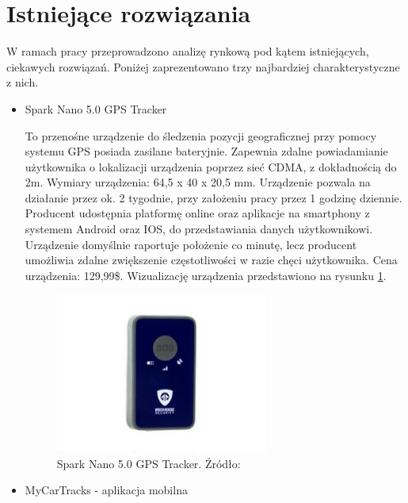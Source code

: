 \section{Istniejące rozwiązania}

W ramach pracy przeprowadzono analizę rynkową pod kątem istniejących, ciekawych rozwiązań. Poniżej zaprezentowano trzy najbardziej charakterystyczne z nich.

\begin{itemize}
\item Spark Nano 5.0 GPS Tracker

To przenośne urządzenie do śledzenia pozycji geograficznej przy pomocy systemu GPS posiada zasilane bateryjnie. Zapewnia zdalne powiadamianie użytkownika o lokalizacji urządzenia poprzez sieć CDMA, z dokładnością do 2m. Wymiary urządzenia: 64,5 x 40 x 20,5 mm. Urządzenie pozwala na działanie przez ok. 2 tygodnie, przy założeniu pracy przez 1 godzinę dziennie. Producent udostępnia platformę online oraz aplikacje na smartphony z systemem Android oraz IOS, do przedstawiania danych użytkownikowi.   Urządzenie domyślnie raportuje położenie co minutę, lecz producent umożliwia zdalne zwiększenie częstotliwości w razie chęci użytkownika. Cena urządzenia: 129,99\$. Wizualizację urządzenia przedstawiono na rysunku \ref{fig:image_spark_nano_tracker}.
\begin{figure}[h]
	\centering
	\includegraphics[width=7cm]{img/introduction/spark_nano.jpg}
	\caption{Spark Nano 5.0 GPS Tracker. Źródło: \cite{spark_nano}}
	\label{fig:image_spark_nano_tracker}
\end{figure}

\item MyCarTracks - aplikacja mobilna


\end{itemize}

